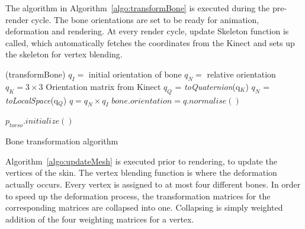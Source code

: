 The algorithm in Algorithm~\ref{algo:transformBone} is executed during the pre-render cycle. The bone orientations are set to be ready for animation, deformation and rendering. At every render cycle, update Skeleton function is called, which automatically fetches the coordinates from the Kinect and sets up the skeleton for vertex blending. 

\begin{algorithm}[ht]
\DontPrintSemicolon %
\function(transformBone){
$q_I =$ initial orientation of bone\;
$q_N =$ relative orientation\;
$q_K = 3\times3$ Orientation matrix from Kinect\;
 {
  $q_Q$ = \textit{toQuaternion}(q$_K$)\;
  $q_N$ = \textit{toLocalSpace}(q$_Q$)\;
  $q = q_N \times q_I$\;
  $\textit{bone.orientation} = \textit{q.normalise}{\left(\right)}$\; }}

 {
  $p_\textit{torso}.\textit{initialize}()$  \;
 }
\caption{Bone transformation algorithm}
\label{algo:transformBone}
\end{algorithm}

Algorithm~\ref{algo:updateMesh} is executed prior to rendering, to update the vertices of the skin. The vertex blending function is where the deformation
actually occurs. Every vertex is assigned to at most four different bones. In order to speed up the deformation process, the transformation matrices for the corresponding matrices are collapsed into one. Collapsing is simply weighted addition of the four weighting matrices for a vertex.


